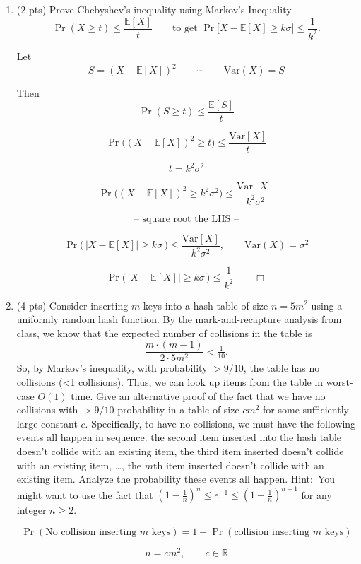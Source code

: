\documentclass[11pt]{article}
\begin{document}
\begin{enumerate}[label=\arabic*.]
	\item (2 pts) Prove Chebyshev's inequality using Markov's Inequality.
\[
\Pr(X \ge t) \le \frac{\mathbb{E}[X]}{t}
\qquad\text{to get }\Pr\!\big[X-\mathbb{E}[X]\ge k\sigma\big]\le \frac{1}{k^2}.
\]

Let
\[
S = (X-\mathbb{E}[X])^2
\qquad \cdots \qquad
\mathrm{Var}(X)=S
\]

Then
\[
\Pr(S \ge t) \le \frac{\mathbb{E}[S]}{t}
\]

\[
\Pr\!\big((X-\mathbb{E}[X])^2 \ge t\big) \le \frac{\mathrm{Var}[X]}{t}
\]

\[
t = k^2\sigma^2
\]

\[
\Pr\!\big((X-\mathbb{E}[X])^2 \ge k^2\sigma^2\big)
\le
\frac{\mathrm{Var}[X]}{k^2\sigma^2}
\]

\[
\text{-- square root the LHS --}
\]

\[
\Pr\!\big(\,|X-\mathbb{E}[X]| \ge k\sigma\,\big)
\le
\frac{\mathrm{Var}[X]}{k^2\sigma^2},
\qquad
\mathrm{Var}(X)=\sigma^2
\]

\[
\Pr\!\big(\,|X-\mathbb{E}[X]| \ge k\sigma\,\big)
\le
\frac{1}{k^2}
\qquad \Box
\]

	\item (4 pts) Consider inserting $m$ keys into a hash table of size $n=5m^2$ using a uniformly random hash function. By the mark-and-recapture analysis from class, we know that the expected number of collisions in the table is
	\[ \frac{m\cdot(m-1)}{2\cdot 5 m^2} < \tfrac{1}{10}. \]
	So, by Markov's inequality, with probability $>9/10$, the table has no collisions (<1 collisions). Thus, we can look up items from the table in worst-case $O(1)$ time. Give an alternative proof of the fact that we have no collisions with $>9/10$ probability in a table of size $c m^2$ for some sufficiently large constant $c$. Specifically, to have no collisions, we must have the following events all happen in sequence: the second item inserted into the hash table doesn't collide with an existing item, the third item inserted doesn't collide with an existing item, \dots, the $m$th item inserted doesn't collide with an existing item. Analyze the probability these events all happen. Hint:\ You might want to use the fact that $\left(1-\tfrac{1}{n}\right)^n \le e^{-1}\le \left(1-\tfrac{1}{n}\right)^{n-1}$ for any integer $n\ge2$.

	\[
	\Pr(\text{No collision inserting $m$ keys})
	=
	1-\Pr(\text{collision inserting $m$ keys})
	\]

	\[
	n = c m^2,\qquad c\in\mathbb{R}
	\]


\end{enumerate}
\end{document}
